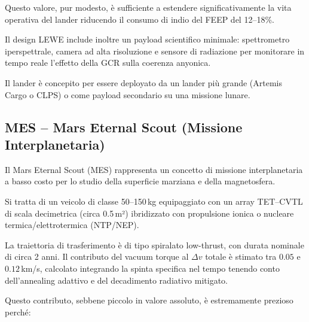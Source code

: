 \documentclass[11pt,a4paper]{article}
\theoremstyle{plain}
\theoremstyle{definition}
\begin{document}
\vspace{0.1cm}

Questo valore, pur modesto, è sufficiente a estendere significativamente la vita operativa del lander riducendo il consumo di indio del FEEP del 12–18\%.

\vspace{0.2cm}

Il design LEWE include inoltre un payload scientifico minimale: spettrometro iperspettrale, camera ad alta risoluzione e sensore di radiazione per monitorare in tempo reale l’effetto della GCR sulla coerenza anyonica. 

\vspace{0.1cm}

Il lander è concepito per essere deployato da un lander più grande (Artemis Cargo o CLPS) o come payload secondario su una missione lunare.



\vspace{0.5cm}


\subsection{MES – Mars Eternal Scout (Missione Interplanetaria)}


\vspace{0.2cm}

Il Mars Eternal Scout (MES) rappresenta un concetto di missione interplanetaria a basso costo per lo studio della superficie marziana e della magnetosfera. 


\vspace{0.3cm}

Si tratta di un veicolo di classe 50–150\,kg equipaggiato con un array TET--CVTL di scala decimetrica (circa 0.5\,m²) ibridizzato con propulsione ionica o nucleare termica/elettrotermica (NTP/NEP).


\vspace{0.3cm}

La traiettoria di trasferimento è di tipo spiralato low-thrust, con durata nominale di circa 2 anni. Il contributo del vacuum torque al $\Delta v$ totale è stimato tra $0.05$ e $0.12$\,km/s, calcolato integrando la spinta specifica nel tempo tenendo conto dell’annealing adattivo e del decadimento radiativo mitigato.


\vspace{0.3cm}

Questo contributo, sebbene piccolo in valore assoluto, è estremamente prezioso perché:
\end{document}
